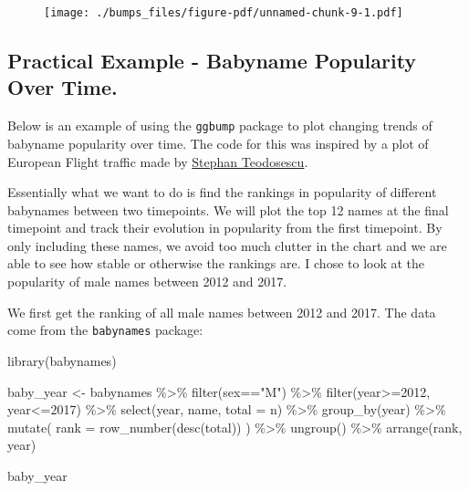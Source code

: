 \documentclass[
  letterpaper,
  DIV=11,
  numbers=noendperiod]{scrreprt}
\newenvironment{Shaded}{\begin{snugshade}}{\end{snugshade}}
\newcommand{\AttributeTok}[1]{\textcolor[rgb]{0.40,0.45,0.13}{#1}}
\newcommand{\DecValTok}[1]{\textcolor[rgb]{0.68,0.00,0.00}{#1}}
\newcommand{\FunctionTok}[1]{\textcolor[rgb]{0.28,0.35,0.67}{#1}}
\newcommand{\NormalTok}[1]{\textcolor[rgb]{0.00,0.23,0.31}{#1}}
\newcommand{\OtherTok}[1]{\textcolor[rgb]{0.00,0.23,0.31}{#1}}
\newcommand{\SpecialCharTok}[1]{\textcolor[rgb]{0.37,0.37,0.37}{#1}}
\newcommand{\StringTok}[1]{\textcolor[rgb]{0.13,0.47,0.30}{#1}}
\begin{document}
\begin{figure}[H]

{\centering \texttt{[image: ./bumps\_files/figure-pdf/unnamed-chunk-9-1.pdf]}

}

\end{figure}

\hypertarget{practical-example---babyname-popularity-over-time.}{%
\subsection{Practical Example - Babyname Popularity Over
Time.}\label{practical-example---babyname-popularity-over-time.}}

Below is an example of using the \texttt{ggbump} package to plot
changing trends of babyname popularity over time. The code for this was
inspired by a plot of European Flight traffic made by
\href{https://github.com/steodose/Tidy-Tuesday/blob/master/Week\%2028_2022.R}{Stephan
Teodosescu}.

Essentially what we want to do is find the rankings in popularity of
different babynames between two timepoints. We will plot the top 12
names at the final timepoint and track their evolution in popularity
from the first timepoint. By only including these names, we avoid too
much clutter in the chart and we are able to see how stable or otherwise
the rankings are. I chose to look at the popularity of male names
between 2012 and 2017.

We first get the ranking of all male names between 2012 and 2017. The
data come from the \texttt{babynames} package:

\begin{Shaded}
\begin{Highlighting}[]
\FunctionTok{library}\NormalTok{(babynames)}

\NormalTok{baby\_year }\OtherTok{\textless{}{-}}\NormalTok{ babynames }\SpecialCharTok{\%\textgreater{}\%}
  \FunctionTok{filter}\NormalTok{(sex}\SpecialCharTok{==}\StringTok{"M"}\NormalTok{) }\SpecialCharTok{\%\textgreater{}\%}
  \FunctionTok{filter}\NormalTok{(year}\SpecialCharTok{\textgreater{}=}\DecValTok{2012}\NormalTok{, year}\SpecialCharTok{\textless{}=}\DecValTok{2017}\NormalTok{) }\SpecialCharTok{\%\textgreater{}\%}
  \FunctionTok{select}\NormalTok{(year, name, }\AttributeTok{total =}\NormalTok{ n) }\SpecialCharTok{\%\textgreater{}\%}
  \FunctionTok{group\_by}\NormalTok{(year) }\SpecialCharTok{\%\textgreater{}\%}
  \FunctionTok{mutate}\NormalTok{(}
    \AttributeTok{rank =} \FunctionTok{row\_number}\NormalTok{(}\FunctionTok{desc}\NormalTok{(total))}
\NormalTok{  ) }\SpecialCharTok{\%\textgreater{}\%}
  \FunctionTok{ungroup}\NormalTok{() }\SpecialCharTok{\%\textgreater{}\%}
  \FunctionTok{arrange}\NormalTok{(rank, year)}

\NormalTok{baby\_year}
\end{Highlighting}
\end{Shaded}
\end{document}
